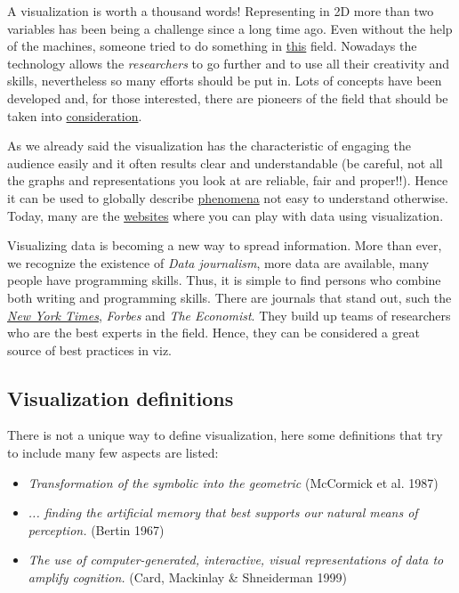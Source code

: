 A visualization is worth a thousand words! Representing in 2D more than two variables has been being a challenge since a long time ago. Even without the help of the machines, someone tried to do something in \href{https://en.wikipedia.org/wiki/Charles\_Joseph\_Minard}{this} field. Nowadays the technology allows the \emph{researchers} to go further and to use all their creativity and skills, nevertheless so many efforts should be put in. Lots of concepts have been developed and, for those interested, there are pioneers of the field that should be taken into \href{https://en.wikipedia.org/wiki/Edward\_Tufte}{consideration}.

As we already said the visualization has the characteristic of engaging the audience easily and it often results clear and understandable (be careful, not all the graphs and representations you look at are reliable, fair and proper!!). Hence it can be used to globally describe \href{https://www.ted.com/talks/hans\_rosling\_shows\_the\_best\_stats\_you\_ve\_ever\_seen}{phenomena} not easy to understand otherwise. Today, many are the \href{https://www.gapminder.org/tools/#\_chart-type=bubbles\&state\_time\_end=2015;\&entities\%2F\_minimap\_show\_geo.cat@=main\%2F\_religion\%2F\_2008;;;\&marker_color\_which=geo.main\%2F\_religion\%2F\_2008}{websites} where you can play with data using visualization.

Visualizing data is becoming a new way to spread information. More than ever, we recognize the existence of \emph{Data journalism}, more data are available, many people have programming skills. Thus, it is simple to find persons who combine both writing and programming skills. There are journals that stand out, such the \href{http://www.nytimes.com/interactive/2014/06/05/upshot/how-the-recession-reshaped-the-economy-in-255-charts.html?\_r=0}{\emph{New York Times}}, \emph{Forbes} and \emph{The Economist}. They build up teams of researchers who are the best experts in the field. Hence, they can be considered a great source of best practices in viz.

\subsection{Visualization definitions}

There is not a unique way to define visualization, here some definitions that try to include many few aspects are listed:

\begin{itemize}
\item \emph{Transformation of the symbolic into the geometric} (McCormick et al. 1987) 
\item \emph{... finding the artificial memory that best supports our natural means of perception.} (Bertin 1967)
\item \emph{The use of computer-generated, interactive, visual representations of data to amplify cognition.} (Card, Mackinlay \& Shneiderman 1999) 
\end{itemize}

